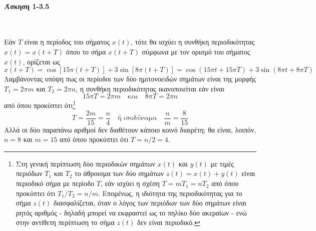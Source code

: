 \documentclass[a4paper,twoside,10pt,openany]{memoir}
\theoremstyle{dotless}
\newcounter{problem}[section] %
\begin{document}
\pagestyle{empty}


\paragraph {Άσκηση 1-3.5}~\medskip


\begin{solution}
Εάν $T$ είναι η περίοδος του σήματος $x(t)$, τότε θα ισχύει η συνθήκη περιοδικότητας $x(t)=x(t+T)$ όπου το σήμα $x(t+T)$ σύμφωνα με τον ορισμό του σήματος $x(t)$, ορίζεται ως
\begin{equation*}
x(t+T)=\cos[15\pi(t+T)]+3\sin[8\pi(t+T)]=\cos(15\pi t+15\pi T)+3\sin(8\pi t+8\pi T)
\end{equation*}
Λαμβάνοντας υπόψη πως οι περίοδοι των δύο ημιτονοειδών σημάτων είναι της μορφής $T_1=2\pi m$ και $T_2=2\pi n$, η συνθήκη περιοδικότητας ικανοποιείται εάν είναι
\begin{equation*}
15\pi T=2\pi m\quad\mbox{και}\quad 8\pi T=2\pi n
\end{equation*}
από όπου προκύπτει ότι\footnote{Στη γενική περίπτωση δύο περιοδικών σημάτων $x(t)$ και $y(t)$ με τιμές περιόδων $T_1$ και $T_2$ το άθροισμα των δύο σημάτων $z(t)=x(t)+y(t)$ είναι περιοδικό σήμα με περίοδο $T$, εάν ισχύει η σχέση $T=mT_1=nT_2$ από όπου προκύπτει ότι $T_1/T_2=n/m$. Επομένως, η ιδιότητα της περιοδικότητας για το σήμα $z(t)$ διασφαλίζεται, όταν ο λόγος των περιόδων των δύο σημάτων είναι ρητός αριθμός - δηλαδή μπορεί να εκφραστεί ως το πηλίκο δύο ακεραίων - ενώ στην αντίθετη περίπτωση το σήμα $z(t)$ δεν είναι περιοδικό.}
\begin{equation*}
T=\frac{2m}{15}=\frac{n}{4}\quad\mbox{ή ισοδύναμα}\quad\frac{n}{m}=\frac{8}{15}
\end{equation*}
Αλλά οι δύο παραπάνω αριθμοί δεν διαθέτουν κάποιο κοινό διαιρέτη; θα είναι, λοιπόν, $n=8$ και $m=15$ από όπου προκύπτει ότι $T=n/2=4$.
\end{solution}
\end{document}
